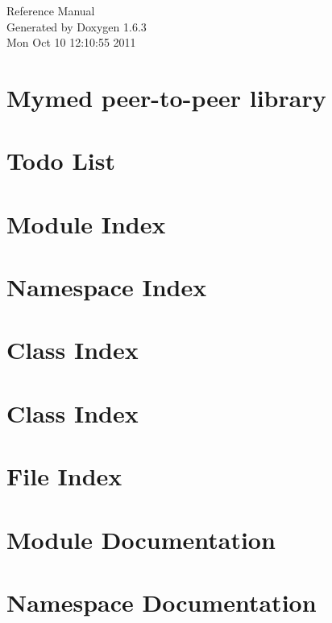 \documentclass[a4paper]{book}
\begin{document}
\hypersetup{pageanchor=false}
\begin{titlepage}
\vspace*{7cm}
\begin{center}
{\Large Reference Manual}\\
\vspace*{1cm}
{\large Generated by Doxygen 1.6.3}\\
\vspace*{0.5cm}
{\small Mon Oct 10 12:10:55 2011}\\
\end{center}
\end{titlepage}
\clearemptydoublepage
{}
\tableofcontents
\clearemptydoublepage
{}
\hypersetup{pageanchor=true}
\chapter{Mymed peer-\/to-\/peer library}
\label{index}\hypertarget{index}{}
\chapter{Todo List}
\label{todo}
\hypertarget{todo}{}

\chapter{Module Index}

\chapter{Namespace Index}

\chapter{Class Index}

\chapter{Class Index}

\chapter{File Index}

\chapter{Module Documentation}

\chapter{Namespace Documentation}



\end{document}
